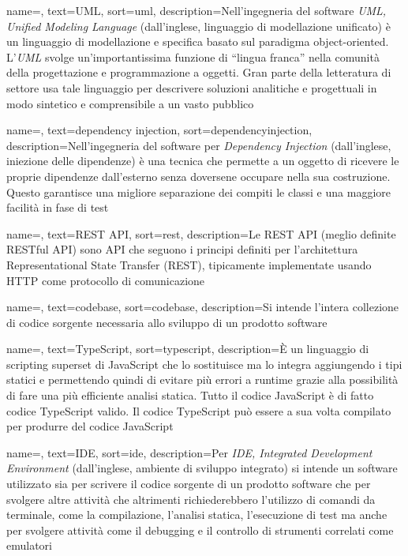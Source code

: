 {
    name=,
    text=UML,
    sort=uml,
    description={Nell'ingegneria del software \emph{UML, Unified Modeling Language} (dall'inglese, linguaggio di modellazione unificato) è un linguaggio di modellazione e specifica basato sul paradigma object-oriented. L'\emph{UML} svolge un'importantissima funzione di ``lingua franca'' nella comunità della progettazione e programmazione a oggetti. Gran parte della letteratura di settore usa tale linguaggio per descrivere soluzioni analitiche e progettuali in modo sintetico e comprensibile a un vasto pubblico}
}

{
    name=,
    text=dependency injection,
    sort=dependencyinjection,
    description={Nell'ingegneria del software per \emph{Dependency Injection} (dall'inglese, iniezione delle dipendenze) è una tecnica che permette a un oggetto di ricevere le proprie dipendenze dall'esterno senza doversene occupare nella sua costruzione. Questo garantisce una migliore separazione dei compiti le classi e una maggiore facilità in fase di test}
}

{
    name=,
    text=REST API,
    sort=rest,
    description={Le REST API (meglio definite RESTful API) sono API che seguono i principi definiti per l'architettura Representational State Transfer (REST), tipicamente implementate usando HTTP come protocollo di comunicazione}
}

{
    name=,
    text=codebase,
    sort=codebase,
    description={Si intende l'intera collezione di codice sorgente necessaria allo sviluppo di un prodotto software}
}

{
    name=,
    text=TypeScript,
    sort=typescript,
    description={È un linguaggio di scripting superset di JavaScript che lo sostituisce ma lo integra aggiungendo i tipi statici e permettendo quindi di evitare più errori a runtime grazie alla possibilità di fare una più efficiente analisi statica. Tutto il codice JavaScript è di fatto codice TypeScript valido. Il codice TypeScript può essere a sua volta compilato per produrre del codice JavaScript}
}

{
    name=,
    text=IDE,
    sort=ide,
    description={Per \emph{IDE, Integrated Development Environment} (dall'inglese, ambiente di sviluppo integrato) si intende un software utilizzato sia per scrivere il codice sorgente di un prodotto software che per svolgere altre attività che altrimenti richiederebbero l'utilizzo di comandi da terminale, come la compilazione, l'analisi statica, l'esecuzione di test ma anche per svolgere attività come il debugging e il controllo di strumenti correlati come emulatori}
}

